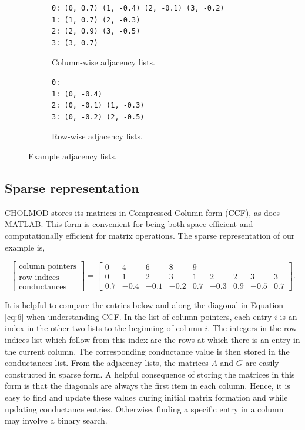 \documentclass[11pt]{article}
\begin{document}
\begin{figure}[!htbp]
\centering
\begin{subfigure}{.5\textwidth}
  \centering
  \begin{verbatim}
0: (0, 0.7) (1, -0.4) (2, -0.1) (3, -0.2) 
1: (1, 0.7) (2, -0.3) 
2: (2, 0.9) (3, -0.5) 
3: (3, 0.7) 
  \end{verbatim}
  \caption{\centering Column-wise adjacency lists.}
  \label{fig:c}
\end{subfigure}%
\begin{subfigure}{.5\textwidth}
  \centering
    \begin{verbatim}
0: 
1: (0, -0.4) 
2: (0, -0.1) (1, -0.3) 
3: (0, -0.2) (2, -0.5) 
  \end{verbatim}
  \caption{\centering Row-wise adjacency lists.}
  \label{fig:d}
\end{subfigure}
\caption{Example adjacency lists.}
\label{fig:adj}
\end{figure}

\subsection{Sparse representation}
CHOLMOD stores its matrices in Compressed Column form (CCF), as does MATLAB. This form is convenient for being both space efficient and computationally efficient for matrix operations. The sparse representation of our example is,

\begin{equation}\label{eq:n}
    \begin{bmatrix}
    \text{column pointers}\\
    \text{row indices}\\
    \text{conductances}
    \end{bmatrix}=
    \begin{bmatrix}
    0 & 4 & 6 & 8 & 9\\
    0 & 1 & 2 & 3 & 1 & 2 & 2 & 3 & 3\\
    0.7 & -0.4 & -0.1 & -0.2 & 0.7 & -0.3 & 0.9 & -0.5 & 0.7
    \end{bmatrix}.
\end{equation}

It is helpful to compare the entries below and along the diagonal in Equation \ref{eq:6} when understanding CCF. In the list of column pointers, each entry $i$ is an index in the other two lists to the beginning of column $i$. The integers in the row indices list which follow from this index are the rows at which there is an entry in the current column. The corresponding conductance value is then stored in the conductances list. From the adjacency lists, the matrices $A$ and $G$ are easily constructed in sparse form. A helpful consequence of storing the matrices in this form is that the diagonals are always the first item in each column. Hence, it is easy to find and update these values during initial matrix formation and while updating conductance entries. Otherwise, finding a specific entry in a column may involve a binary search.
\end{document}
